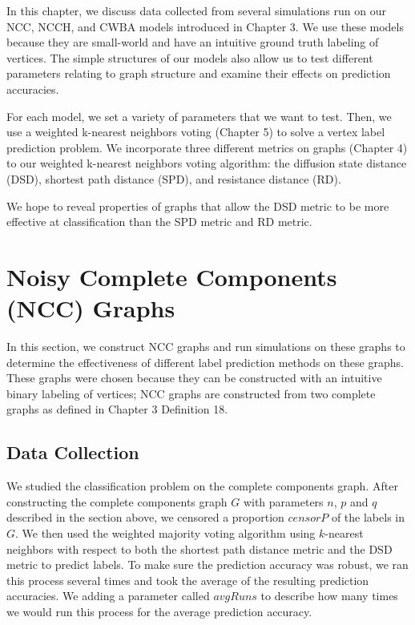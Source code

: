 In this chapter, we discuss data collected from several simulations run on
our NCC, NCCH, and CWBA models introduced in Chapter 3. We use these models
because they are small-world and have an intuitive ground truth labeling of 
vertices. The simple structures of our models also allow us to test 
different parameters relating to graph structure and examine their effects
on prediction accuracies.

For each model, we set a variety of parameters that we want to test.
Then, we use a weighted k-nearest neighbors voting (Chapter 5) to solve
a vertex label prediction problem. We incorporate three different metrics
on graphs (Chapter 4) to our weighted k-nearest neighbors voting algorithm: 
the diffusion state distance (DSD), shortest path distance (SPD), and
resistance distance (RD).

We hope to reveal properties of graphs that allow the DSD metric to be more 
effective at classification than the SPD metric and RD metric.


\section{Noisy Complete Components (NCC) Graphs}
In this section, we construct NCC graphs and run simulations on these 
graphs to determine the effectiveness of different label prediction methods 
on these graphs. These graphs were chosen because they can be constructed 
with an intuitive binary labeling of vertices; NCC graphs are constructed 
from two complete graphs as defined in Chapter 3 Definition 18.

\subsection{Data Collection}
We studied the classification problem on the complete components graph. After constructing the complete components graph $G$ with parameters $n$, $p$ and $q$ described in the section above, we censored a proportion $censorP$ of the labels in $G$. We then used the weighted majority voting algorithm using $k$-nearest neighbors with respect to both the shortest path distance metric and the DSD metric to predict labels. To make sure the prediction accuracy was robust, we ran this process several times and took the average of the resulting prediction accuracies. We adding a parameter called $avgRuns$ to describe how many times we would run this process for the average prediction accuracy.

